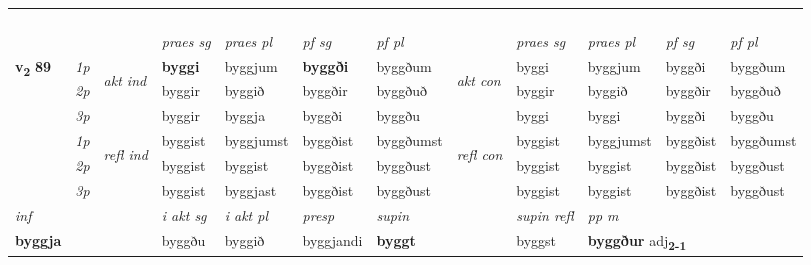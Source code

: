 \begin{longtable}[l]{X>{\footnotesize\itshape}llXXXXlXXXX}
\midrule
 & \\*
   & \\*
   & \\*
  & \\
   \midrule

 & &   & \textit{praes sg}  & \textit{praes pl}    & \textit{ pf sg} & \textit{pf pl} & & \textit{praes sg}  & \textit{praes pl}    & \textit{pf sg} & \textit{pf pl }  \\ \cmidrule{4-7} \cmidrule{9-12}
 \multirow{2}{*}{{{\textbf{v{\textsubscript{2}}} \Large{\textbf{89}}}}}  & 1p & \multirow{3}{*}{\begin{turn}{90}\textit{akt ind}\end{turn}} & \textbf{byggi} & byggjum & \textbf{byggði} & byggðum & \multirow{3}{*}{\begin{turn}{90}\textit{akt con}\end{turn}} &byggi & byggjum & byggði & byggðum\\*
 & 2p &  &  byggir  & byggið & byggðir & byggðuð & & byggir & byggið & byggðir & byggðuð \\*
 & 3p &  & byggir & byggja & byggði & byggðu & & byggi & byggi& byggði & byggðu \\*
\cmidrule{4-7} \cmidrule{9-12}
 & 1p & \multirow{3}{*}{\begin{turn}{90}\textit{refl ind}\end{turn}}  & byggist & byggjumst & byggðist & byggðumst & \multirow{3}{*}{\begin{turn}{90}\textit{refl con}\end{turn}}  &byggist & byggjumst & byggðist & byggðumst \\*
 & 2p &  & byggist & byggist & byggðist & byggðust & &byggist & byggist & byggðist & byggðust \\*
 & 3p  & & byggist & byggjast & byggðist & byggðust & & byggist & byggist& byggðist & byggðust \\*
\cmidrule{4-7} \cmidrule{9-12}

   {\textit{inf}} & &  & \textit{i akt sg} & \textit{i akt pl}   & \textit{presp} & \textit{supin} && \textit{supin refl} & \textit{pp m} \\*
  {\textbf{byggja}} & && byggðu  & byggið   & byggjandi &  \textbf{byggt} && byggst & \multicolumn{2}{l}{\textbf{byggður} adj\textbf{\textsubscript{2-1}}} \\*

\midrule


\end{longtable}
